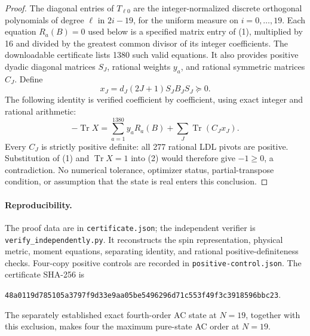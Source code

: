 \documentclass[11pt]{article}
\newcommand{\Tr}{\operatorname{Tr}}
\begin{document}
\begin{proof}
The diagonal entries of $T_{\ell0}$ are the integer-normalized discrete
orthogonal polynomials of degree $\ell$ in $2i-19$, for the uniform measure
on $i=0,\ldots,19$. Each equation $R_a(B)=0$ used below is a specified
matrix entry of (1), multiplied by 16 and divided by the greatest common
divisor of its integer coefficients. The downloadable certificate lists
1380 such valid equations. It also provides positive dyadic diagonal
matrices $S_J$, rational weights $y_a$, and rational symmetric matrices $C_J$.
Define
\[
 x_J=d_J(2J+1)S_JB_JS_J\succeq0.
\]
The following identity is verified coefficient by coefficient, using
exact integer and rational arithmetic:
\[
 \boxed{-\Tr X=\sum_{a=1}^{1380}y_aR_a(B)
                  +\sum_J\Tr(C_Jx_J).} \tag{2}
\]
Every $C_J$ is strictly positive definite: all 277 rational LDL pivots are
positive. Substitution of (1) and $\Tr X=1$ into (2) would therefore give
$-1\geq0$, a contradiction. No numerical tolerance, optimizer status,
partial-transpose condition, or assumption that the state is real enters
this conclusion.
\end{proof}

\paragraph{Reproducibility.}
The proof data are in \texttt{certificate.json}; the independent verifier is
\texttt{verify\_independently.py}. It reconstructs the spin representation,
physical metric, moment equations, separating identity, and rational
positive-definiteness checks. Four-copy positive controls are recorded in
\texttt{positive-control.json}. The certificate SHA-256 is
\begin{center}\small\texttt{48a0119d785105a3797f9d33e9aa05be5496296d71c553f49f3c3918596bbc23}.\end{center}
The separately established exact fourth-order AC state at $N=19$, together
with this exclusion, makes four the maximum pure-state AC order at $N=19$.
\end{document}
